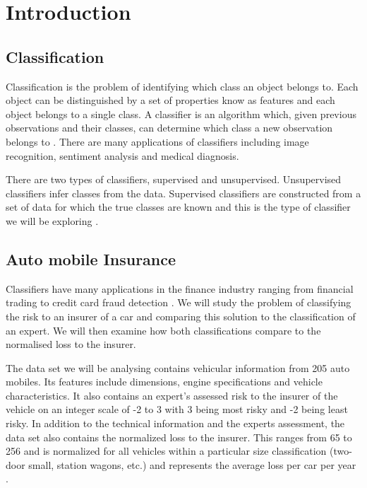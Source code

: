 \chapter{Introduction}

\section{Classification}

Classification is the problem of identifying which class an object belongs to. Each object can be distinguished by a set of properties know as features and each object belongs to a single class. A classifier is an algorithm which, given previous observations and their classes, can determine which class a new observation belongs to \cite{Theodoridis03}. There are many applications of classifiers including image recognition, sentiment analysis and medical diagnosis.

There are two types of classifiers, supervised and unsupervised. Unsupervised classifiers infer classes from the data. Supervised classifiers are constructed from a set of data for which the true classes are known and this is the type of classifier we will be exploring \cite{Michie94}.

\section{Auto mobile Insurance}

Classifiers have many applications in the finance industry ranging from financial trading \cite{Gerlein16} to credit card fraud detection \cite{Pozzolo15}. We will study the problem of classifying the risk to an insurer of a car and comparing this solution to the classification of an expert. We will then examine how both classifications compare to the normalised loss to the insurer.

The data set we will be analysing contains vehicular information from 205 auto mobiles. Its features include dimensions, engine specifications and vehicle characteristics. It also contains an expert's assessed risk to the insurer of the vehicle on an integer scale of -2 to 3 with 3 being most risky and -2 being least risky. In addition to the technical information and the experts assessment, the data set also contains the normalized loss to the insurer. This ranges from 65 to 256 and is normalized for all vehicles within a particular size classification (two-door small, station wagons, etc.) and represents the average loss per car per year \cite{Automobile}.